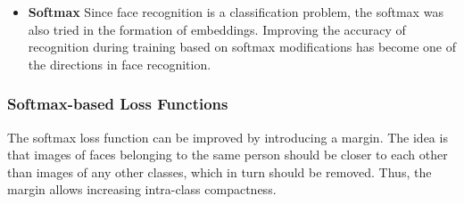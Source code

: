 \documentclass[11pt,a4paper]{article}
\begin{document}
\begin{itemize}
\item{\bf{Softmax}}
Since face recognition is a classification problem, the softmax \cite{softmax}  was also tried in the formation of embeddings. Improving the accuracy of recognition during training based on softmax \cite{softmax} modifications has become one of the directions in face recognition.

\end{itemize}

\subsubsection{Softmax-based Loss Functions}
The softmax loss function can be improved by introducing a margin. The idea is that images of faces belonging to the same person should be closer to each other than images of any other classes, which in turn should be removed. Thus, the margin allows increasing intra-class compactness.
\end{document}
